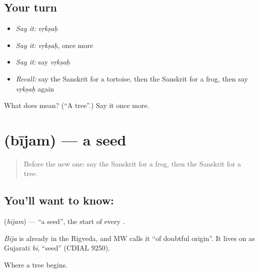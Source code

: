 \subsection*{Your turn}
\begin{itemize}
\raggedright
  \item \emph{Say it:} \emph{vṛkṣaḥ}
  \item \emph{Say it:} \emph{vṛkṣaḥ}, once more
  \item \emph{Say it:} say \emph{vṛkṣaḥ}
  \item \emph{Recall:} say the Sanskrit for a tortoise, then the Sanskrit for a frog, then say \emph{vṛkṣaḥ} again
\end{itemize}

\begin{tcolorbox}[breakable,colback=teal!4,colframe=teal!35!black,title={Before you move on}]
What does  mean? (\textquotedblleft{}A tree\textquotedblright{}.) Say it once more.
\end{tcolorbox}
\section[\texorpdfstring{\sk{बीजम्} (bījam)}{बीजम् (bījam)}]{ (bījam) — a seed}

\label{lesson:SA-C81-seed}



\begin{quote}
Before the new one: say the Sanskrit for a frog, then the Sanskrit for a tree.
\end{quote}

\subsection*{You'll want to know: }
\textbf{} (\emph{bījam}) — \textquotedblleft{}a seed\textquotedblright{}, the start of every \textbf{}.

\begin{cousinweb}
\emph{Bīja} is already in the Rigveda, and MW calls it \textquotedblleft{}of doubtful origin\textquotedblright{}. It lives on as Gujarati \emph{bī}, \textquotedblleft{}seed\textquotedblright{} (CDIAL 9250).
\end{cousinweb}

\begin{grammarlens}[title={What you've built}]
Where a tree begins.
\end{grammarlens}

